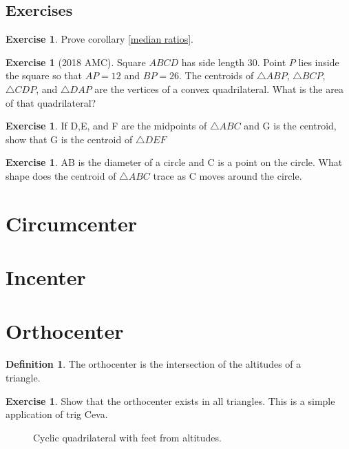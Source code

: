 \documentclass[letterpaper]{article}
\theoremstyle{plain}
\theoremstyle{definition}
\newtheorem{definition}[thm]{Definition}
\newtheorem{exercise}[thm]{Exercise}
\theoremstyle{remark}
\begin{document}
    \subsection*{Exercises}
    \begin{exercise}
        Prove corollary \ref{median ratios}.
    \end{exercise}
    \begin{exercise}[2018 AMC]
        Square $ABCD$ has side length $30$. Point $P$ lies inside the square so that $AP = 12$ and $BP = 26$. The centroids of $\triangle{ABP}$, $\triangle{BCP}$, $\triangle{CDP}$, and $\triangle{DAP}$ are the vertices of a convex quadrilateral. What is the area of that quadrilateral?
    \end{exercise}
    \begin{exercise} If D,E, and F are the midpoints of $\triangle ABC$ and G is the centroid, show that G is the centroid of $\triangle DEF$
    \end{exercise}
    \begin{exercise} AB is the diameter of a circle and C is a point on the circle. What shape does the centroid of $\triangle ABC$ trace as C moves around the circle.
    \end{exercise}

\section{Circumcenter}
\section{Incenter}
\section{Orthocenter}
\begin{mdframed}
    \begin{definition}
        The orthocenter is the intersection of the altitudes of a \\triangle.
   \end{definition} 
\end{mdframed}
\begin{exercise}
    Show that the orthocenter exists in all triangles. This is a simple application of trig Ceva.
\end{exercise}


\begin{figure}[!htb]
    \centering
    \scalebox{.75}{}
    \caption{Cyclic quadrilateral with feet from altitudes.}
    \label{fig:cyclic_orthocenter}

\end{figure}
\end{document}
